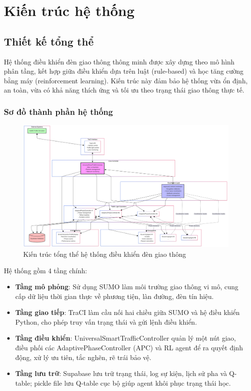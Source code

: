 \chapter{Kiến trúc hệ thống}

\section{Thiết kế tổng thể}

Hệ thống điều khiển đèn giao thông thông minh được xây dựng theo mô hình phân tầng, kết hợp giữa điều khiển dựa trên luật (rule-based) và học tăng cường bằng máy (reinforcement learning). Kiến trúc này đảm bảo hệ thống vừa ổn định, an toàn, vừa có khả năng thích ứng và tối ưu theo trạng thái giao thông thực tế.

\subsection{Sơ đồ thành phần hệ thống}

\begin{figure}[H]
    \centering
    \includegraphics[width=1\linewidth]{Untitled diagram _ Mermaid Chart-2025-08-21-023904.png}
    \caption{Kiến trúc tổng thể hệ thống điều khiển đèn giao thông}
\end{figure}

Hệ thống gồm 4 tầng chính:
\begin{itemize}
    \item \textbf{Tầng mô phỏng}: Sử dụng SUMO làm môi trường giao thông vi mô, cung cấp dữ liệu thời gian thực về phương tiện, làn đường, đèn tín hiệu.
    \item \textbf{Tầng giao tiếp}: TraCI làm cầu nối hai chiều giữa SUMO và hệ điều khiển Python, cho phép truy vấn trạng thái và gửi lệnh điều khiển.
    \item \textbf{Tầng điều khiển}: UniversalSmartTrafficController quản lý một nút giao, điều phối các AdaptivePhaseController (APC) và RL agent để ra quyết định động, xử lý ưu tiên, tắc nghẽn, rẽ trái bảo vệ.
    \item \textbf{Tầng lưu trữ}: Supabase lưu trữ trạng thái, log sự kiện, lịch sử pha và Q-table; pickle file lưu Q-table cục bộ giúp agent khôi phục trạng thái học.
\end{itemize}

